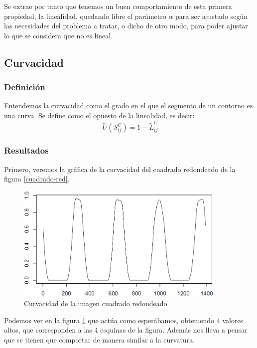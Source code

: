 Se extrae por tanto que tenemos un buen comportamiento de esta primera propiedad, la linealidad, quedando libre el parámetro $\alpha$ para ser ajustado según las necesidades del problema a tratar, o dicho de otro modo, para poder ajustar lo que se considera que no es lineal.\\

\subsection{Curvacidad}


\subsubsection{Definición}

Entendemos la curvacidad como el grado en el que el segmento de un contorno es una curva. Se define como el opuesto de la linealidad, es decir:\\

\[
\ \tilde{U}(S^C_{ij}) = 1 - \tilde{L}^C_{ij}
\]
 
\subsubsection{Resultados}

Primero, veremos la gráfica de la curvacidad del cuadrado redondeado de la figura \ref{cuadrado-red}.

\begin{figure}[H]
\begin{center}
\includegraphics[width=0.9\textwidth]{img/nolin-dev3-1-limpio-0815.png}
\end{center}

\caption{Curvacidad de la imagen cuadrado redondeado.}
\label{fig9}
\end{figure}

Podemos ver en la figura \ref{fig9} que actúa como esperábamos, obteniendo 4 valores altos, que corresponden a las 4 esquinas de la figura. Además nos lleva a pensar que se tienen que comportar de manera similar a la curvatura.\\

